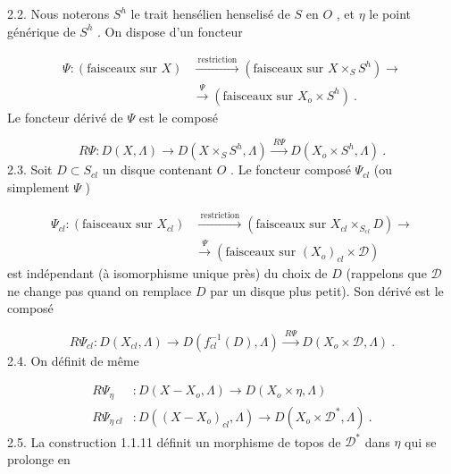 
2.2. Nous noterons $S^h$ le trait hensélien henselisé de $S$ en $O$ , et $\eta$ le point générique de $S^h$ . On dispose d'un foncteur

\begin{equation*}
\begin{aligned}
\Psi : (\text{faisceaux sur } X) &\xrightarrow{\ \text{restriction}\ } (\text{faisceaux sur } X \times_S S^h) \longrightarrow \\
&\xrightarrow{\ \Psi\ } (\text{faisceaux sur } X_o \times S^h) \ .
\end{aligned}
\end{equation*}
Le foncteur dérivé de $\Psi$ est le composé

\begin{equation*}
R\Psi : D(X, \Lambda) \longrightarrow D(X \times_S S^h, \Lambda) \xrightarrow{\ R\Psi\ } D(X_o \times S^h, \Lambda) \ .
\end{equation*}
2.3. Soit $D \subset S_{cl}$ un disque contenant $O$ . Le foncteur composé $\Psi_{cl}$ (ou simplement $\Psi$ )

\begin{equation*}
\begin{aligned}
\Psi_{cl} : (\text{faisceaux sur } X_{cl}) &\xrightarrow{\ \text{restriction}\ } (\text{faisceaux sur } X_{cl} \times_{S_{cl}} D) \longrightarrow \\
&\xrightarrow{\ \Psi\ } (\text{faisceaux sur } (X_o)_{cl} \times \mathcal{D})
\end{aligned}
\end{equation*}
est indépendant (à isomorphisme unique près) du choix de $D$ (rappelons que $\mathcal{D}$ ne change pas quand on remplace $D$ par un disque plus petit). Son dérivé est le composé

\begin{equation*}
R\Psi_{cl} : D(X_{cl}, \Lambda) \longrightarrow D(f_{cl}^{-1}(D), \Lambda) \xrightarrow{\ R\Psi\ } D(X_o \times \mathcal{D}, \Lambda) \ .
\end{equation*}
2.4. On définit de même

\begin{equation*}
\begin{aligned}
R\Psi_{\eta} &: D(X-X_o, \Lambda) \longrightarrow D(X_o \times \eta, \Lambda) \\
R\Psi_{\eta\ cl} &: D((X-X_o)_{cl}, \Lambda) \longrightarrow D(X_o \times \mathcal{D}^*, \Lambda) \ .
\end{aligned}
\end{equation*}
2.5. La construction 1.1.11 définit un morphisme de topos de $\mathcal{D}^*$ dans $\eta$ qui se prolonge en

